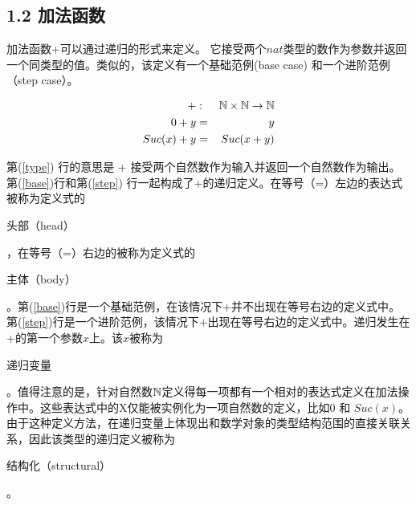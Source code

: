 \documentclass[twocolumn]{article}
\begin{document}
\begin{CJK}{UTF8}{gbsn}
\subsection*{1.2 加法函数}
\label{addition}

\indent \indent \indent 加法函数$+$可以通过递归的形式来定义。 它接受两个$nat$类型的数作为参数并返回一个同类型的值。类似的，该定义有一个基础范例(base case) 和一个进阶范例（step case）。

\begin{eqnarray}
 + & : & \mathbb{N} \times \mathbb{N} \rightarrow \mathbb{N} \label{type} \\
0+y & = & y  \label{base} \\
Suc(x)+y & = & Suc(x+y) \label{step}
\end{eqnarray}

\indent \indent 第(\ref{type}) 行的意思是 + 接受两个自然数作为输入并返回一个自然数作为输出。第(\ref{base})行和第(\ref{step}) 行一起构成了+的递归定义。在等号（=）左边的表达式被称为定义式的
\begin{CJK}{UTF8}{gkai}头部（head）\end{CJK}，在等号（=）右边的被称为定义式的\begin{CJK}{UTF8}{gkai}主体（body）\end{CJK}。第(\ref{base})行是一个基础范例，在该情况下+并不出现在等号右边的定义式中。第(\ref{step})行是一个进阶范例，该情况下+出现在等号右边的定义式中。递归发生在+的第一个参数$x$上。该$x$被称为\begin{CJK}{UTF8}{gkai}递归变量\end{CJK}。值得注意的是，针对自然数$\mathbb{N}$定义得每一项都有一个相对的表达式定义在加法操作中。这些表达式中的X仅能被实例化为一项自然数的定义，比如$0$ 和 $Suc(x)$。由于这种定义方法，在递归变量上体现出和数学对象的类型结构范围的直接关联关系，因此该类型的递归定义被称为\begin{CJK}{UTF8}{gkai}结构化（structural）\end{CJK}。\\




\end{CJK}
\end{document}
